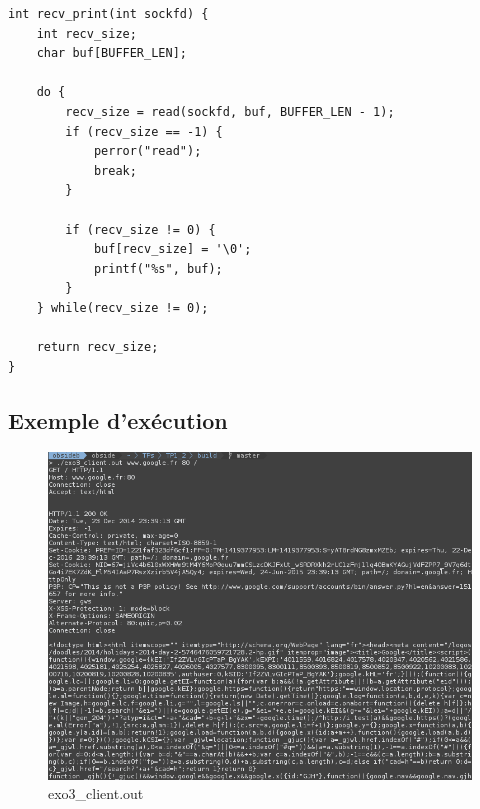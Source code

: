 \begin{lstlisting}
int recv_print(int sockfd) {
    int recv_size;
    char buf[BUFFER_LEN];

    do {
        recv_size = read(sockfd, buf, BUFFER_LEN - 1);
        if (recv_size == -1) {
            perror("read");
            break;
        }

        if (recv_size != 0) {
            buf[recv_size] = '\0';
            printf("%s", buf);
        }
    } while(recv_size != 0);

    return recv_size;
}
\end{lstlisting}
\newpage

\subsection{Exemple d'exécution}
\begin{figure}[h!]
	\centering
	\includegraphics[width=1.0\textwidth]{screenshots/ex3.png}
	\caption{exo3\_client.out}
\end{figure}

